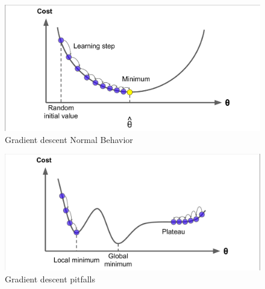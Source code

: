 \documentclass[conference]{IEEEtran}
\begin{document}
\begin{figure}[h]
    \includegraphics[scale=0.2]{GradientDescentNormal.jpeg}
    \caption{Gradient descent Normal Behavior\cite{Scikit-Learn}}
    \label{fig:normalbeh}
\end{figure}
\begin{figure}[h]
    \includegraphics[scale=0.2]{GradientDescentPitfalls.png}
    \caption{Gradient descent pitfalls\cite{Scikit-Learn}}
    \label{fig:pitfallsbeh}
\end{figure}
\end{document}

